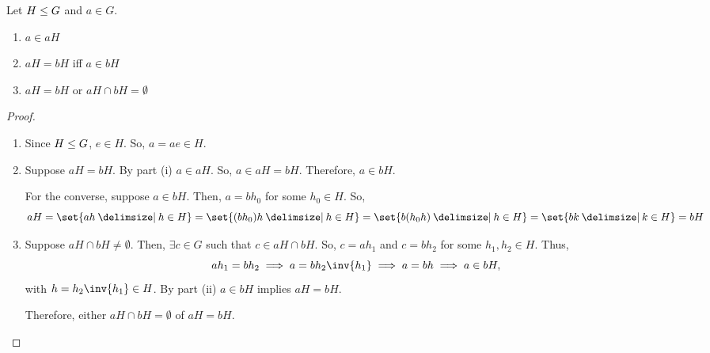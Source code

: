 \documentclass[11pt]{penrose}
\begin{document}
\begin{nthm}\label{thm:coset-properties-a}
    Let $H \mathrel{\leq} G$ and $a \in G$.
    \begin{enumerate}[label=(\roman*)]
        \item $a \in aH$
        \item $aH = bH$ iff $a \in bH$
        \item $aH = bH$ or $aH \cap bH = \emptyset$
    \end{enumerate}
\end{nthm}
\begin{proof}
    \begin{enumerate}[label=(\roman*)]
        \item Since $H \mathrel{\leq} G$, $e \in H$. So, $a = ae \in H$.

        \item Suppose $aH = bH$. By part (i) $a \in aH$. So, $a \in aH = bH$. Therefore, $a \in bH$.

        For the converse, suppose $a \in bH$. Then, $a = bh_0$ for some $h_0 \in H$. So,
        \begin{equation}
            aH
            = \set{ah \st h \in H}
            = \set{(bh_0)h \st h \in H}
            = \set{b(h_0 h) \st h \in H}
            = \set{bk \st k \in H}
            = bH
        \end{equation}

        \item Suppose $aH \cap bH \neq \emptyset$. Then, $\exists c \in G$ such that $c \in aH \cap bH$. So, $c = ah_1$ and $c = bh_2$ for some $h_1, h_2 \in H$. Thus,
        \begin{equation}
            ah_1 = bh_2
            \implies a = bh_2 \inv{h_1}
            \implies a = bh
            \implies a \in bH,
        \end{equation}
        with $h = h_2 \inv{h_1} \in H$. By part (ii) $a \in bH$ implies $aH = bH$.

        Therefore, either $aH \cap bH = \emptyset$ of $aH = bH$.\qedhere
    \end{enumerate}
\end{proof}
\end{document}
